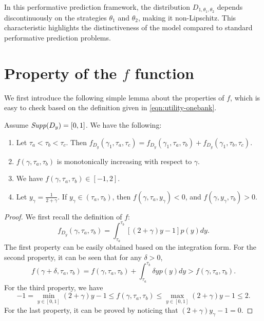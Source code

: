 In this performative prediction framework, the distribution \(D_{1,\theta_1,\theta_2}\) depends discontinuously on the strategies \(\theta_1\) and \(\theta_2\), making it non-Lipschitz. This characteristic highlights the distinctiveness of the model compared to standard performative prediction problems.


\section{Property of the $f$ function} 
We first introduce the following simple lemma about the properties of $f$, which is easy to check based on the definition given in \eqref{eqn:utility-onebank}.
\begin{lemma}
\label{lem:property of f}
Assume $\emph{Supp}(D_y)=[0,1]$. We have the following:
\begin{enumerate}
\item Let $\tau_a<\tau_b<\tau_c$. Then $f_{D_y}(\gamma_1,\tau_a,\tau_c)=f_{D_y}(\gamma_1,\tau_a,\tau_b)+f_{D_y}(\gamma_1,\tau_b,\tau_c)$.
    \item $f(\gamma,\tau_a,\tau_b)$ is monotonically increasing with respect to $\gamma$. 
     \item We have $f(\gamma,\tau_a,\tau_b)\in[-1,2]$. 
    \item Let $y_{\gamma}=\frac{1}{2+\gamma}$. If $y_{\gamma}\in(\tau_a,\tau_b)$, then $f(\gamma,\tau_a,y_{\gamma})<0$, and  $f(\gamma,y_{\gamma},\tau_b)>0$.    
\end{enumerate}   
\end{lemma}
\begin{proof}
    We first recall the definition of $f$: 
    \begin{equation*}
    f_{D_y}(\gamma,\tau_a,\tau_b)=\int_{\tau_a}^{\tau_b}[(2+\gamma)y-1]p(y)dy.
\end{equation*}
The first property can be easily obtained based on the integration form. For the second property, it can be seen that for any $\delta>0$, 
$$f(\gamma+\delta,\tau_{a},\tau_b)=f(\gamma,\tau_{a},\tau_b)+ \int_{\tau_{a}}^{\tau_b}\delta yp(y)dy> f(\gamma,\tau_{a},\tau_b).$$
For the third property, we have 
$$ -1=\min_{y\in[0,1]}(2+\gamma)y-1\leq f(\gamma,\tau_{a},\tau_b)\leq \max_{y\in[0,1]}(2+\gamma)y-1\leq 2. $$
For the last property, it can be proved by noticing that $(2+\gamma)y_{\gamma}-1=0$.
\end{proof}

